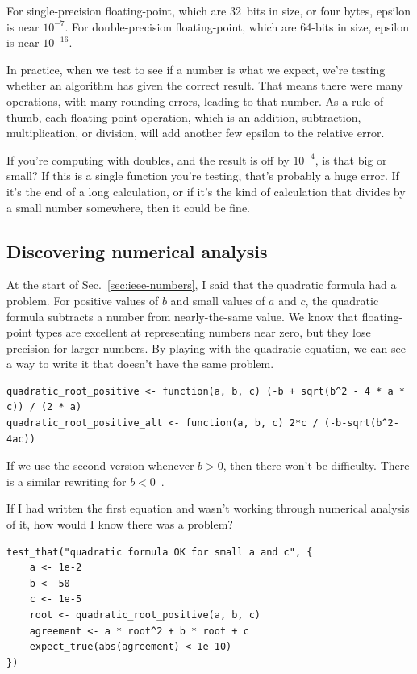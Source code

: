 \documentclass[fleqn,10pt]{olplainarticle}
\begin{document}
For single-precision floating-point, which are 32~bits in size,
or four bytes, epsilon is near $10^{-7}$. For double-precision
floating-point, which are 64-bits in size, epsilon is near
$10^{-16}$.

In practice, when we test to see if a number is what we expect,
we're testing whether an algorithm has given the correct result.
That means there were many operations, with many rounding errors,
leading to that number. As a rule of thumb, each floating-point
operation, which is an addition, subtraction, multiplication,
or division, will add another few epsilon to the relative error.

If you're computing with doubles, and the result is off by $10^{-4}$,
is that big or small? If this is a single function you're testing,
that's probably a huge error. If it's the end of a long calculation,
or if it's the kind of calculation that divides by a small number somewhere,
then it could be fine.


\subsection{Discovering numerical analysis}

At the start of Sec.~\ref{sec:ieee-numbers}, I said that the
quadratic formula had a problem. For positive values of $b$
and small values of $a$ and $c$, the quadratic formula subtracts
a number from nearly-the-same value. We know that floating-point
types are excellent at representing numbers near zero, but they
lose precision for larger numbers. By playing with the quadratic
equation, we can see a way to write it that doesn't have the same
problem.

\begin{lstlisting}
quadratic_root_positive <- function(a, b, c) (-b + sqrt(b^2 - 4 * a * c)) / (2 * a)
quadratic_root_positive_alt <- function(a, b, c) 2*c / (-b-sqrt(b^2-4ac))
\end{lstlisting}

If we use the second version whenever $b>0$, then there won't
be difficulty.
There is a similar rewriting for $b<0$~\citep{overton2001numerical}.

If I had written the first equation and wasn't working through
numerical analysis of it, how would I know there was a problem?

\begin{lstlisting}
test_that("quadratic formula OK for small a and c", {
    a <- 1e-2
    b <- 50
    c <- 1e-5
    root <- quadratic_root_positive(a, b, c)
    agreement <- a * root^2 + b * root + c
    expect_true(abs(agreement) < 1e-10)
})
\end{lstlisting}
\end{document}

